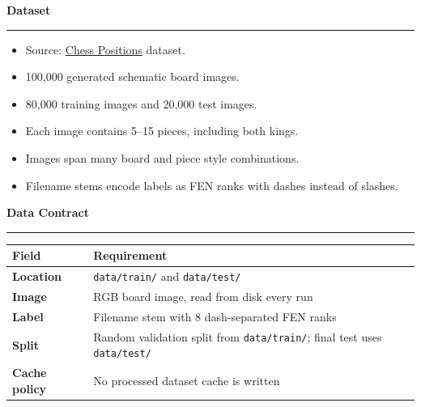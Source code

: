 \documentclass[aspectratio=169,10pt]{beamer}
\newcommand{\SlideTitle}[1]{%
  \vspace{0.2em}%
  {\titlefont\color{TitleBlack}\Large\bfseries #1}\par\vspace{0.35em}%
  {\color{Accent}\rule{0.16\paperwidth}{1.4pt}}\vspace{0.7em}%
}
\begin{document}
\begin{frame}
  \SlideTitle{Dataset}
  \begin{itemize}
    \item Source: \href{https://www.kaggle.com/datasets/koryakinp/chess-positions}{Chess Positions} dataset.
    \item 100,000 generated schematic board images.
    \item 80,000 training images and 20,000 test images.
    \item Each image contains 5--15 pieces, including both kings.
    \item Images span many board and piece style combinations.
    \item Filename stems encode labels as FEN ranks with dashes instead of slashes.
  \end{itemize}
\end{frame}

\begin{frame}
  \SlideTitle{Data Contract}
  \begin{tabularx}{\textwidth}{@{}>{\bfseries\color{TitleBlack}}lX@{}}
    \toprule
    Field & Requirement \\
    \midrule
    Location & \texttt{data/train/} and \texttt{data/test/} \\
    Image & RGB board image, read from disk every run \\
    Label & Filename stem with 8 dash-separated FEN ranks \\
    Split & Random validation split from \texttt{data/train/}; final test uses \texttt{data/test/} \\
    Cache policy & No processed dataset cache is written \\
    \bottomrule
  \end{tabularx}
\end{frame}
\end{document}
